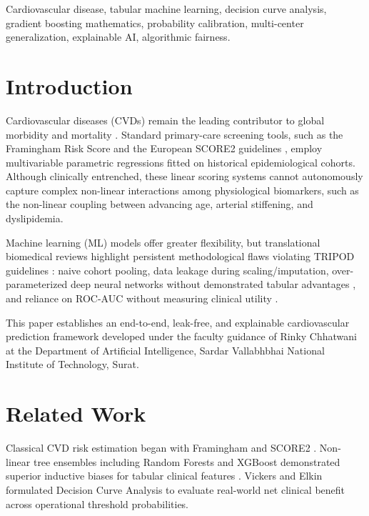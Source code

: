 \documentclass[conference]{IEEEtran}
\begin{document}
\begin{IEEEkeywords}
Cardiovascular disease, tabular machine learning, decision curve analysis, gradient boosting mathematics, probability calibration, multi-center generalization, explainable AI, algorithmic fairness.
\end{IEEEkeywords}

\section{Introduction}
Cardiovascular diseases (CVDs) remain the leading contributor to global morbidity and mortality \cite{who_cvd_2021}. Standard primary-care screening tools, such as the Framingham Risk Score \cite{framingham_2008} and the European SCORE2 guidelines \cite{score2_2021}, employ multivariable parametric regressions fitted on historical epidemiological cohorts. Although clinically entrenched, these linear scoring systems cannot autonomously capture complex non-linear interactions among physiological biomarkers, such as the non-linear coupling between advancing age, arterial stiffening, and dyslipidemia.

Machine learning (ML) models offer greater flexibility, but translational biomedical reviews highlight persistent methodological flaws violating TRIPOD guidelines \cite{steyerberg_tripod_2015}: naive cohort pooling, data leakage during scaling/imputation, over-parameterized deep neural networks without demonstrated tabular advantages \cite{shwartz_tabular_2022, grinsztajn_tabular_2022}, and reliance on ROC-AUC without measuring clinical utility \cite{vickers_dca_2006, vickers_dca_update_2016}.

This paper establishes an end-to-end, leak-free, and explainable cardiovascular prediction framework developed under the faculty guidance of Rinky Chhatwani at the Department of Artificial Intelligence, Sardar Vallabhbhai National Institute of Technology, Surat.

\section{Related Work}
Classical CVD risk estimation began with Framingham \cite{framingham_2008} and SCORE2 \cite{score2_2021}. Non-linear tree ensembles including Random Forests \cite{breiman_rf_2001} and XGBoost \cite{chen_xgboost_2016} demonstrated superior inductive biases for tabular clinical features \cite{grinsztajn_tabular_2022}. Vickers and Elkin \cite{vickers_dca_2006} formulated Decision Curve Analysis to evaluate real-world net clinical benefit across operational threshold probabilities.
\end{document}
